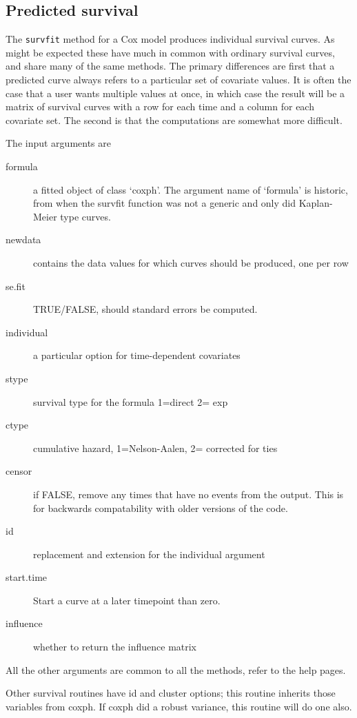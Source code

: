 \documentclass{article}
\newcommand{\code}[1]{\texttt{#1}}
\begin{document}
\subsection{Predicted survival}
The \code{survfit} method for a Cox model produces individual survival
curves.  As might be expected these have much in common with
ordinary survival curves, and share many of the same methods.
The primary differences are first that a predicted curve always refers
to a particular set of covariate values.   
It is often the case that a user wants multiple values at once, in 
which case the result will be a matrix of survival curves with a row
for each time and a column for each covariate set.
The second is that the computations are somewhat more difficult.

The input arguments are
\begin{description}
  \item[formula] a fitted object of class `coxph'.  The argument name of 
    `formula' is historic, from when the survfit function was not a generic
    and only did Kaplan-Meier type curves.
  \item[newdata] contains the data values for which curves should be
    produced, one per row
  \item[se.fit] TRUE/FALSE, should standard errors be computed.
  \item[individual] a particular option for time-dependent covariates
  \item[stype] survival type for the formula 1=direct 2= exp
  \item[ctype] cumulative hazard, 1=Nelson-Aalen, 2= corrected for ties
  \item[censor] if FALSE, remove any times that have no events from the
    output.  This is for 
    backwards compatability with older versions of the code.
  \item[id] replacement and extension for the individual argument
  \item[start.time] Start a curve at a later timepoint than zero.
  \item[influence] whether to return the influence matrix
\end{description}
All the other arguments are common to all the methods, refer to the 
help pages.

Other survival routines have id and cluster options; this routine inherits
those variables from coxph.  If coxph did a robust variance, this routine
will do one also.
\end{document}
